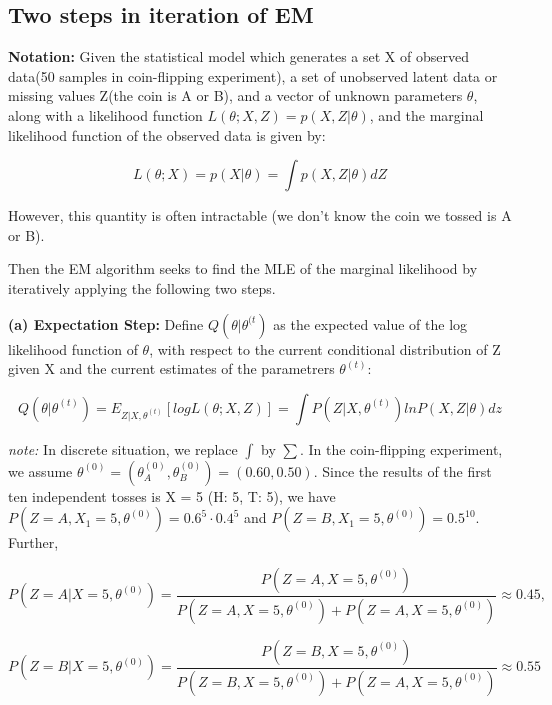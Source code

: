 \documentclass[11pt]{scrartcl} %
\begin{document}
\subsection{Two steps in iteration of EM}
\textbf{Notation:} Given the statistical model which generates a set X of observed data(50 samples in coin-flipping experiment), a set of unobserved latent data or missing values Z(the coin is A or B), and a vector of unknown parameters $\theta$, along with a likelihood function $L(\theta; X, Z) = p(X, Z| \theta)$,  and the marginal likelihood function of the observed data is given by:

$$L(\theta; X) = p(X| \theta) = \int p(X, Z| \theta)dZ$$

However, this quantity is often intractable (we don't know the coin we tossed is A or B). 

Then the EM algorithm seeks to find the MLE of the marginal likelihood by iteratively applying the following two steps.

\textbf{(a) Expectation Step:} Define $Q(\theta| \theta^{(t})$ as the expected value of the log likelihood function of $\theta$, with respect to the current conditional distribution of Z given X and the current estimates of the parametrers $\theta^{(t)}$:

$$Q(\theta|\theta^{(t)}) = E_{Z|X,\theta^{(t)}}[logL(\theta; X, Z)] = \int P(Z|X, \theta^{(t)}) ln P(X, Z| \theta)dz $$

\textit{note:} In discrete situation, we replace $\int$ by $\sum$.  In the coin-flipping experiment, we assume $\theta^{(0)} = (\theta_A^{(0)}, \theta_B^{(0)}) = (0.60, 0.50)$. Since the results of the first ten independent tosses is X = 5 ({H: 5, T: 5}), we have $P(Z = A, X_1=5, \theta^{(0)}) = 0.6^5 \cdot 0.4^5$ and $P(Z = B, X_1=5, \theta^{(0)}) = 0.5^{10}$. Further,

$$P(Z = A|X = 5, \theta^{(0)}) = \frac{P(Z = A, X=5, \theta^{(0)})}{P(Z = A, X=5, \theta^{(0)}) + P(Z = A, X=5, \theta^{(0)})} \approx 0.45,$$ 

$$P(Z = B|X = 5, \theta^{(0)}) = \frac{P(Z = B, X=5, \theta^{(0)})}{P(Z = B, X=5, \theta^{(0)}) + P(Z = A, X=5, \theta^{(0)})} \approx 0.55$$




\end{document}
